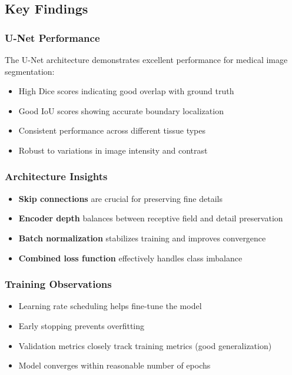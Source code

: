 \documentclass[12pt,a4paper]{article}
\begin{document}
\subsection{Key Findings}

\subsubsection{U-Net Performance}
The U-Net architecture demonstrates excellent performance for medical image segmentation:
\begin{itemize}
    \item High Dice scores indicating good overlap with ground truth
    \item Good IoU scores showing accurate boundary localization
    \item Consistent performance across different tissue types
    \item Robust to variations in image intensity and contrast
\end{itemize}

\subsubsection{Architecture Insights}
\begin{itemize}
    \item \textbf{Skip connections} are crucial for preserving fine details
    \item \textbf{Encoder depth} balances between receptive field and detail preservation
    \item \textbf{Batch normalization} stabilizes training and improves convergence
    \item \textbf{Combined loss function} effectively handles class imbalance
\end{itemize}

\subsubsection{Training Observations}
\begin{itemize}
    \item Learning rate scheduling helps fine-tune the model
    \item Early stopping prevents overfitting
    \item Validation metrics closely track training metrics (good generalization)
    \item Model converges within reasonable number of epochs
\end{itemize}
\end{document}
